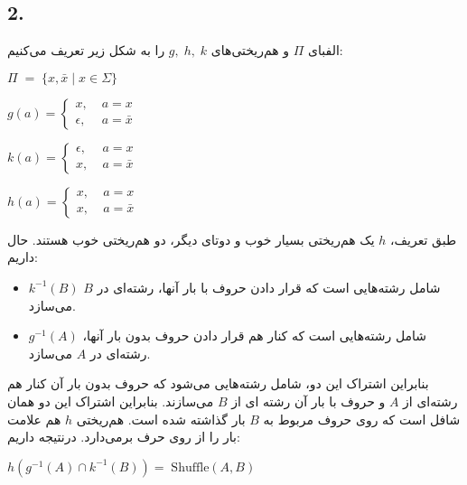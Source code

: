 \subsection*{2. }
الفبای $\Pi$ و هم‌ریختی‌های $g,\;h,\;k$ را به شکل زیر تعریف می‌کنیم:
\begin{center}
    $\Pi \;=\; \{x,\bar{x}\;|\; x \in \Sigma\}$
\end{center}
\begin{center}
    $g(a) = \begin{cases}
            x,\;& a=x\\
            \epsilon, \;& a=\bar{x}
        \end{cases}$\\[0.1in]
\end{center}
\begin{center}
    $k(a) = \begin{cases}
            \epsilon,\;& a=x\\
            x, \;& a=\bar{x}
        \end{cases}$\\[0.1in]
\end{center}
\begin{center}
    $h(a) = \begin{cases}
            x,\;& a=x\\
            x, \;& a=\bar{x}
        \end{cases}$\\[0.1in]
\end{center}
طبق تعریف، $h$ یک هم‌ریختی بسیار خوب و دوتای دیگر، دو هم‌ریختی خوب هستند.
حال داریم:
\begin{itemize}
    \item 
    $k^{-1}(B)$ شامل رشته‌هایی است که قرار دادن حروف با بار آنها، رشته‌ای در $B$ می‌سازد.
    \item 
    $g^{-1}(A)$ شامل رشته‌هایی است که کنار هم قرار دادن حروف بدون بار آنها، رشته‌ای در $A$ می‌سازد.
\end{itemize}
بنابراین اشتراک این دو، شامل رشته‌هایی می‌شود که حروف بدون بار آن کنار هم رشته‌ای از $A$ و حروف با بار آن رشته ای از $B$ می‌سازند. بنابراین اشتراک این دو همان شافل است که روی حروف مربوط به $B$ بار گذاشته شده است. هم‌ریختی $h$ هم علامت بار را از روی حرف برمی‌دارد. درنتیجه داریم:
\\[0.15in]
\begin{center}
    $h(g^{-1}(A) \cap k^{-1}(B)) =\; \text{Shuffle}(A,B)$
\end{center}

